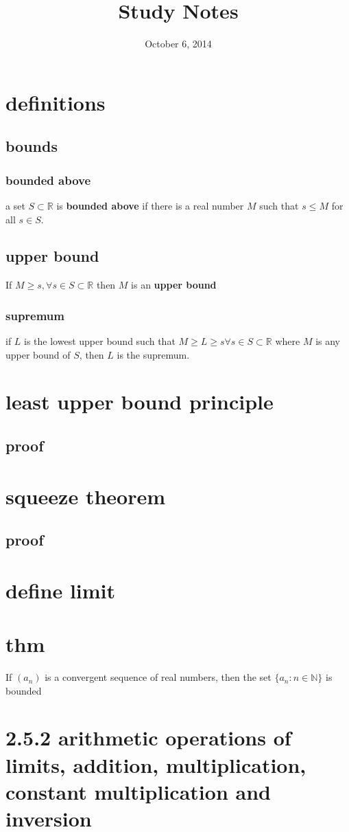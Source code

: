 \documentclass[letterpaper]{article}
\begin{document}
\title{Study Notes}
\date{October 6, 2014}
\maketitle
\section*{definitions}
\subsection*{bounds}
\subsubsection*{bounded above}
a set $S\subset \mathbb{R}$ is {\bfseries bounded above} if there is a real number $M$ such that $s\le M$ for all $s\in S$.
\subsection*{upper bound}
If $M\ge s, \forall s\in S\subset\mathbb{R}$ then $M$ is an {\bfseries upper bound}
\subsubsection*{supremum}
if $L$ is the lowest upper bound such that $M\ge L\ge s\forall s\in S\subset\mathbb{R}$ where $M$ is any upper bound of $S$, then $L$ is the supremum.

\section*{least upper bound principle}
\subsection*{proof}
\section*{squeeze theorem}
\subsection*{proof}
\section*{define limit}
\section*{thm}
If $(a_n)$ is a convergent sequence of real numbers, then the set $\{a_n:n\in \mathbb{N}\}$ is bounded
\section*{2.5.2 arithmetic operations of limits, addition, multiplication, constant multiplication and inversion}
\end{document}
